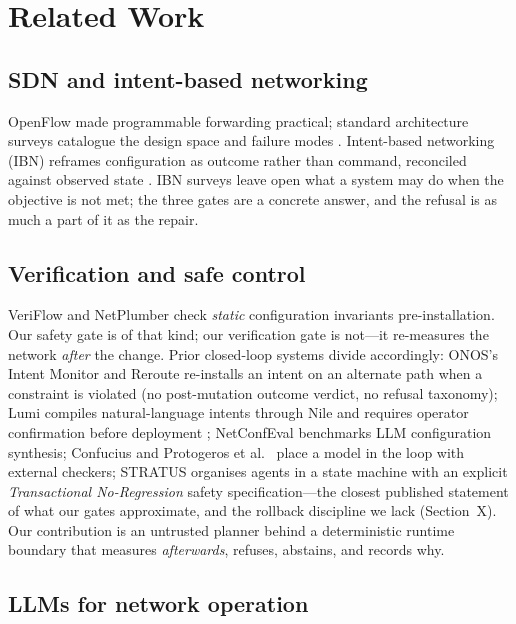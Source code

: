 \documentclass[conference]{IEEEtran}
\begin{document}
\section{Related Work}

\subsection{SDN and intent-based networking}

OpenFlow \cite{mckeown2008openflow} made programmable forwarding practical;
standard architecture surveys catalogue the design space and failure modes
\cite{feamster2014road,kreutz2015sdn}. Intent-based networking (IBN)
reframes configuration as outcome rather than command, reconciled against
observed state \cite{leivadeas2023ibn,rfc9315}. IBN surveys leave open what
a system may do when the objective is not met; the three gates are a
concrete answer, and the refusal is as much a part of it as the repair.

\subsection{Verification and safe control}

VeriFlow \cite{khurshid2013veriflow} and NetPlumber \cite{kazemian2013netplumber}
check \emph{static} configuration invariants pre-installation. Our safety
gate is of that kind; our verification gate is not---it re-measures the
network \emph{after} the change. Prior closed-loop systems divide
accordingly: ONOS's Intent Monitor and Reroute \cite{sanvito2018onos}
re-installs an intent on an alternate path when a constraint is violated
(no post-mutation outcome verdict, no refusal taxonomy); Lumi compiles
natural-language intents through Nile and requires operator confirmation
before deployment \cite{jacobs2021lumi}; NetConfEval \cite{wang2024netconfeval}
benchmarks LLM configuration synthesis; Confucius \cite{wang2025confucius}
and Protogeros et al.\ \cite{protogeros2026repair} place a model in the loop
with external checkers; STRATUS \cite{chen2025stratus} organises agents in a
state machine with an explicit \emph{Transactional No-Regression} safety
specification---the closest published statement of what our gates approximate,
and the rollback discipline we lack (Section~X). Our contribution is an
untrusted planner behind a deterministic runtime boundary that measures
\emph{afterwards}, refuses, abstains, and records why.

\subsection{LLMs for network operation}
\end{document}
